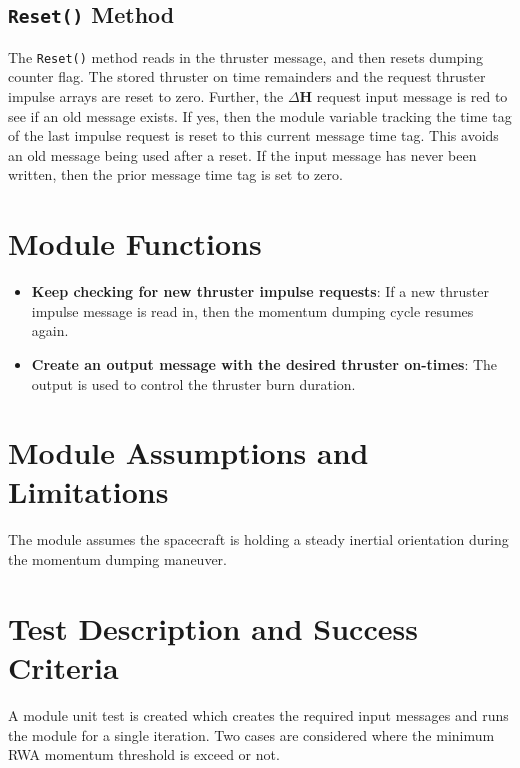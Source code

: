 \documentclass[]{BasiliskReportMemo}
\begin{document}
\subsection{{\tt Reset()} Method}
The {\tt Reset()} method reads in the thruster message, and then resets dumping counter flag.  The stored thruster on time remainders and the request thruster impulse arrays are reset to zero.  Further, the $\Delta\bm H$ request input message is red to see if an old message exists.  If yes, then the module variable tracking the time tag of the last impulse request is reset to this current message time tag. This avoids an old message being used after a reset.  If the input message has never been written, then the prior message time tag is set to zero.









\section{Module Functions}
\begin{itemize}
	\item \textbf{Keep checking for new thruster impulse requests}: If a new thruster impulse message is read in, then the momentum dumping cycle resumes again.
	\item \textbf{Create an output message with the desired thruster on-times}: The output is used to control the thruster burn duration.
\end{itemize}

\section{Module Assumptions and Limitations}
The module assumes the spacecraft is holding a steady inertial orientation during the momentum dumping maneuver.  










\section{Test Description and Success Criteria}
A module unit test is created which creates the required input messages and runs the module for a single iteration.  Two cases are considered where the minimum RWA momentum threshold is exceed or not.
\end{document}
